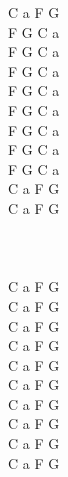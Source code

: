 \documentclass[a5paper, 10pt]{book}
\begin{document}
\begin{minipage}[t]{0.2\textwidth}
C a F G\\

F G C a\\
F G C a\\
F G C a\\
F G C a\\
F G C a\\
F G C a\\
F G C a\\
F G C a\\

C a F G\\

C a F G\\
\\
\\
\\
C a F G\\
C a F G\\

C a F G\\
C a F G\\
C a F G\\
C a F G\\

C a F G\\
C a F G\\
C a F G\\
C a F G\\

\end{minipage}


\end{document}
